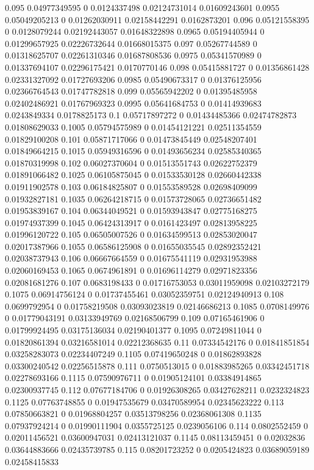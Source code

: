 {0.095 0.04977349595 0 0.0124337498 0.02124731014 0.01609243601
0.0955 0.05049205213 0 0.01262030911 0.02158442291 0.0162873201
0.096 0.05121558395 0 0.0128079244 0.02192443057 0.01648322898
0.0965 0.05194405944 0 0.01299657925 0.02226732644 0.01668015375
0.097 0.05267744589 0 0.01318625707 0.02261310346 0.01687808536
0.0975 0.05341570989 0 0.01337694107 0.02296175421 0.0170770146
0.098 0.05415881727 0 0.01356861428 0.02331327092 0.01727693206
0.0985 0.05490673317 0 0.01376125956 0.02366764543 0.01747782818
0.099 0.05565942202 0 0.01395485958 0.02402486921 0.01767969323
0.0995 0.05641684753 0 0.01414939683 0.0243849334 0.0178825173
0.1 0.05717897272 0 0.01434485366 0.02474782873 0.01808629033
0.1005 0.05794575989 0 0.01454121221 0.02511354559 0.01829100208
0.101 0.05871717066 0 0.01473845449 0.02548207401 0.01849664215
0.1015 0.05949316596 0 0.01493656234 0.02585340365 0.01870319998
0.102 0.06027370604 0 0.01513551743 0.02622752379 0.01891066482
0.1025 0.06105875045 0 0.01533530128 0.02660442338 0.01911902578
0.103 0.06184825807 0 0.01553589528 0.02698409099 0.01932827181
0.1035 0.06264218715 0 0.01573728065 0.02736651482 0.01953839167
0.104 0.06344049521 0 0.01593943847 0.02775168275 0.01974937399
0.1045 0.06424313917 0 0.0161423497 0.02813958225 0.01996120722
0.105 0.06505007526 0 0.01634599513 0.02853020047 0.02017387966
0.1055 0.06586125908 0 0.01655035545 0.02892352421 0.02038737943
0.106 0.06667664559 0 0.01675541119 0.02931953988 0.02060169453
0.1065 0.0674961891 0 0.01696114279 0.02971823356 0.02081681276
0.107 0.0683198433 0 0.01716753053 0.03011959098 0.02103272179
0.1075 0.06914756124 0 0.01737455461 0.03052359751 0.02124940913
0.108 0.0699792954 0 0.01758219508 0.03093023819 0.02146686213
0.1085 0.0708149976 0 0.01779043191 0.03133949769 0.02168506799
0.109 0.07165461906 0 0.01799924495 0.03175136034 0.02190401377
0.1095 0.07249811044 0 0.01820861394 0.03216581014 0.02212368635
0.11 0.07334542176 0 0.01841851854 0.03258283073 0.02234407249
0.1105 0.07419650248 0 0.01862893828 0.03300240542 0.02256515878
0.111 0.0750513015 0 0.01883985265 0.03342451718 0.02278693166
0.1115 0.07590976711 0 0.01905124101 0.03384914865 0.02300937745
0.112 0.07677184706 0 0.01926308265 0.03427628211 0.0232324823
0.1125 0.07763748855 0 0.01947535679 0.03470589954 0.02345623222
0.113 0.07850663821 0 0.01968804257 0.03513798256 0.02368061308
0.1135 0.07937924214 0 0.01990111904 0.0355725125 0.0239056106
0.114 0.0802552459 0 0.02011456521 0.03600947031 0.02413121037
0.1145 0.08113459451 0 0.02032836 0.03644883666 0.02435739785
0.115 0.08201723252 0 0.0205424823 0.03689059189 0.02458415833
}
